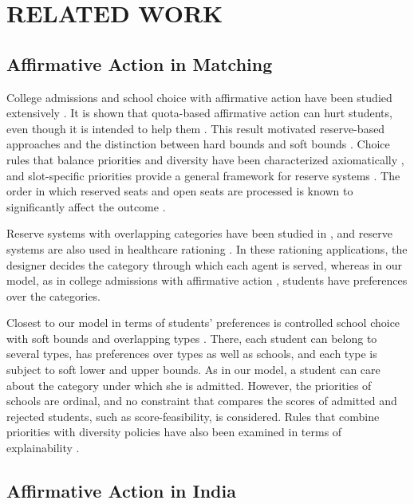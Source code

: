 \documentclass[a4paper,twoside]{article}
\theoremstyle{definition}
\begin{document}
\section{\uppercase{Related Work}}
\label{sec:related}



\subsection{Affirmative Action in Matching}

College admissions and school choice with affirmative action have been studied
extensively \cite{Abdu05a,AbSo03b}.
It is shown that quota-based affirmative action can hurt students, even though it is intended to help them \cite{Koji12a}.
This result motivated reserve-based approaches \cite{HYY13a} and the distinction between hard
bounds and soft bounds \cite{EHYY14a}.
Choice rules that balance priorities and diversity have been characterized axiomatically
\cite{EcYe15a,imamura2025meritocracy}, and slot-specific priorities provide a general
framework for reserve systems \cite{KoSo16a}.
The order in which reserved seats and open seats are processed is known to
significantly affect the outcome \cite{DKPS18a,DPS20a,PRS23a}.

Reserve systems with overlapping categories have been studied in
\cite{SoYe22a,AzSu25a}, and reserve systems are also used in healthcare
rationing \cite{PSUY24a,AzBr24a}.
In these rationing applications, the designer decides the category through which each
agent is served, whereas in our model, as in college admissions with affirmative action
\cite{AyTu20a,AyBo21a}, students have preferences over the categories.

Closest to our model in terms of students' preferences is controlled school choice with
soft bounds and overlapping types \cite{KHIY17a}.
There, each student can belong to several types, has preferences over types as well as
schools, and each type is subject to soft lower and upper bounds.
As in our model, a student can care about the category under which she is admitted.
However, the priorities of schools are ordinal, and no constraint that compares the scores
of admitted and rejected students, such as score-feasibility, is considered.
Rules that combine priorities with diversity policies have also been examined in terms of
explainability \cite{arnosti2024explainable}.

\subsection{Affirmative Action in India}
\end{document}
